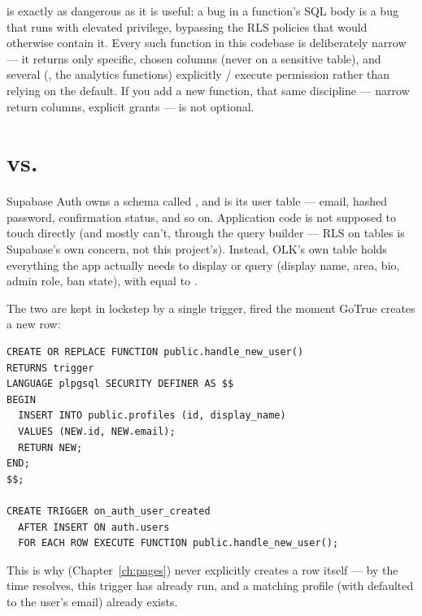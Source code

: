\begin{olkwarn}
 is exactly as dangerous as it is useful: a bug in a  function's SQL body is a bug that runs with elevated privilege, bypassing the RLS policies that would otherwise contain it. Every such function in this codebase is deliberately narrow — it returns only specific, chosen columns (never  on a sensitive table), and several (, the  analytics functions) explicitly / execute permission rather than relying on the default. If you add a new  function, that same discipline — narrow return columns, explicit grants — is not optional.
\end{olkwarn}

\section{ vs. }

Supabase Auth owns a schema called , and  is its user table — email, hashed password, confirmation status, and so on. Application code is not supposed to touch  directly (and mostly can't, through the query builder — RLS on  tables is Supabase's own concern, not this project's). Instead, OLK's own  table holds everything the app actually needs to display or query (display name, area, bio, admin role, ban state), with  equal to .

The two are kept in lockstep by a single trigger, fired the moment GoTrue creates a new  row:

\begin{lstlisting}[style=olkcodesql, caption={The trigger that makes signup "just work" (see supabase/migrations/20260621123649...)}]
CREATE OR REPLACE FUNCTION public.handle_new_user()
RETURNS trigger
LANGUAGE plpgsql SECURITY DEFINER AS $$
BEGIN
  INSERT INTO public.profiles (id, display_name)
  VALUES (NEW.id, NEW.email);
  RETURN NEW;
END;
$$;

CREATE TRIGGER on_auth_user_created
  AFTER INSERT ON auth.users
  FOR EACH ROW EXECUTE FUNCTION public.handle_new_user();
\end{lstlisting}

This is why  (Chapter~\ref{ch:pages}) never explicitly creates a  row itself — by the time  resolves, this trigger has already run, and a matching profile (with  defaulted to the user's email) already exists.

